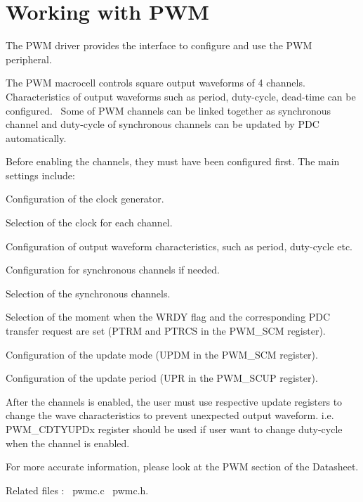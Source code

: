 \hypertarget{group__pwm__module}{}\section{Working with P\+WM}
\label{group__pwm__module}
The P\+WM driver provides the interface to configure and use the P\+WM peripheral.

The P\+WM macrocell controls square output waveforms of 4 channels. Characteristics of output waveforms such as period, duty-\/cycle, dead-\/time can be configured.~\newline
Some of P\+WM channels can be linked together as synchronous channel and duty-\/cycle of synchronous channels can be updated by P\+DC automatically.

Before enabling the channels, they must have been configured first. The main settings include\+: 
\begin{DoxyItemize}
\item Configuration of the clock generator. 
\item Selection of the clock for each channel. 
\item Configuration of output waveform characteristics, such as period, duty-\/cycle etc. 
\item Configuration for synchronous channels if needed.
\begin{DoxyItemize}
\item Selection of the synchronous channels.
\item Selection of the moment when the W\+R\+DY flag and the corresponding P\+DC transfer request are set (P\+T\+RM and P\+T\+R\+CS in the P\+W\+M\+\_\+\+S\+CM register).
\item Configuration of the update mode (U\+P\+DM in the P\+W\+M\+\_\+\+S\+CM register).
\item Configuration of the update period (U\+PR in the P\+W\+M\+\_\+\+S\+C\+UP register). 
\end{DoxyItemize}
\end{DoxyItemize}

After the channels is enabled, the user must use respective update registers to change the wave characteristics to prevent unexpected output waveform. i.\+e. P\+W\+M\+\_\+\+C\+D\+T\+Y\+U\+P\+Dx register should be used if user want to change duty-\/cycle when the channel is enabled.

For more accurate information, please look at the P\+WM section of the Datasheet.

Related files \+:~\newline
pwmc.\+c~\newline
 pwmc.\+h.~\newline
 